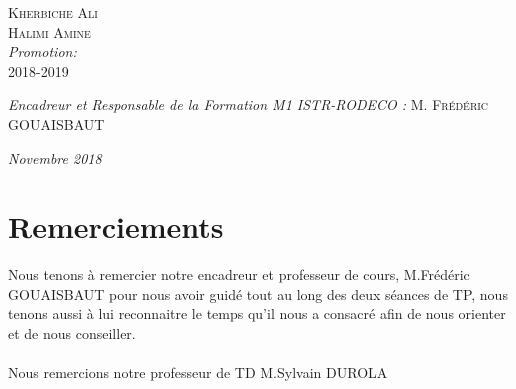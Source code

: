 \documentclass[12pt, a4paper, openany]{report}
\begin{document}
\begin{titlepage}
\begin{sffamily}
\begin{center}
    \begin{minipage}{0.4\textwidth}
      \begin{flushleft} \large
         \textsc{Kherbiche Ali}\\
         \textsc{Halimi Amine}\\
        \emph {Promotion:} \\
         \textsc{2018-2019}\\
      \end{flushleft}
    \end{minipage}
    \begin{minipage}{0.4\textwidth}
      \begin{flushright} \large
        \emph{Encadreur et Responsable de la Formation M1 ISTR-RODECO :}  \textsc{M. Frédéric GOUAISBAUT}\\
      \end{flushright}
    \end{minipage}

    \vfill

    \emph{\large Novembre 2018}

  \end{center}
  \end{sffamily}      
          
  \end{titlepage}
  
\makeatother



\chapter*{Remerciements}
  
   Nous tenons à remercier notre encadreur et professeur de cours, M.Frédéric GOUAISBAUT pour nous avoir guidé tout au long des deux séances de TP, nous tenons aussi à lui reconnaitre le temps qu'il nous a consacré afin de nous orienter et de nous conseiller.\\
   \\
   Nous remercions notre professeur de TD M.Sylvain DUROLA     
   
\tableofcontents
\listoffigures
\listoftables
\end{document}

